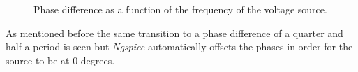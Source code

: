 \begin{figure}[H]
\hspace{-10mm}
  \caption{Phase difference as a function of the frequency of the voltage source.} 
\end{figure}

As mentioned before the same transition to a phase difference of a quarter and half a period is seen but \textit{Ngspice} automatically offsets the phases in order for the source to be at 0 degrees.


